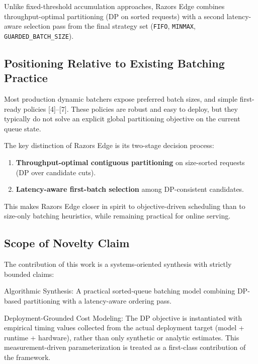 \documentclass{article}
\providecommand{\tightlist}{\setlength{\itemsep}{0pt}\setlength{\parskip}{0pt}}
\begin{document}
Unlike fixed-threshold accumulation approaches, Razor\textquotesingle s
Edge combines throughput-optimal partitioning (DP on sorted requests)
with a second latency-aware selection pass from the final strategy set
(\texttt{FIFO}, \texttt{MINMAX}, \texttt{GUARDED\_BATCH\_SIZE}).

\hypertarget{23-positioning-relative-to-existing-batching-practice}{%
\subsection{Positioning Relative to Existing Batching
Practice}\label{23-positioning-relative-to-existing-batching-practice}}

Most production dynamic batchers expose preferred batch sizes, and
simple first-ready policies {[}4{]}--{[}7{]}. These policies are robust
and easy to deploy, but they typically do not solve an explicit global
partitioning objective on the current queue state.

The key distinction of Razor\textquotesingle s Edge is its two-stage
decision process:

\begin{enumerate}
\def\labelenumi{\arabic{enumi}.}
\tightlist
\item
  \textbf{Throughput-optimal contiguous partitioning} on size-sorted
  requests (DP over candidate cuts).
\item
  \textbf{Latency-aware first-batch selection} among DP-consistent
  candidates.
\end{enumerate}

This makes Razor\textquotesingle s Edge closer in spirit to
objective-driven scheduling than to size-only batching heuristics, while
remaining practical for online serving.

\hypertarget{24-scope-of-novelty-claim}{%
\subsection{Scope of Novelty
Claim}\label{24-scope-of-novelty-claim}}

The contribution of this work is a systems-oriented synthesis with
strictly bounded claims:

Algorithmic Synthesis: A practical sorted-queue batching model combining
DP-based partitioning with a latency-aware ordering pass.

Deployment-Grounded Cost Modeling: The DP objective is instantiated with
empirical timing values collected from the actual deployment target
(model + runtime + hardware), rather than only synthetic or analytic
estimates. This measurement-driven parameterization is treated as a
first-class contribution of the framework.
\end{document}
